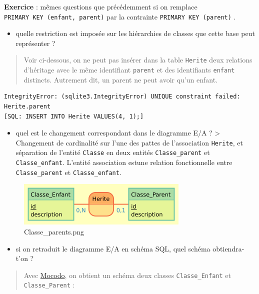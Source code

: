 \documentclass[11pt]{article}
\makeatletter
\def\maxwidth{\ifdim\Gin@nat@width>\linewidth\linewidth
    \else\Gin@nat@width\fi}
\let\Oldincludegraphics\includegraphics
\renewcommand{\includegraphics}[1]{\Oldincludegraphics[width=.8\maxwidth]{#1}}
\providecommand{\tightlist}{%
      \setlength{\itemsep}{0pt}\setlength{\parskip}{0pt}}
\makeatother
\begin{document}
    \textbf{Exercice} : mêmes questions que précédemment si on remplace
\texttt{PRIMARY\ KEY\ (enfant,\ parent)} par la contrainte
\texttt{PRIMARY\ KEY\ (parent)} .

\begin{itemize}
\tightlist
\item
  quelle restriction est imposée sur les hiérarchies de classes que
  cette base peut représenter ?
\end{itemize}

\begin{quote}
Voir ci-dessous, on ne peut pas insérer dans la table \texttt{Herite}
deux relations d'héritage avec le même identifiant \texttt{parent} et
des identifiants \texttt{enfant} distincts. Autrement dit, un parent ne
peut avoir qu'un enfant.
\end{quote}

\begin{verbatim}
IntegrityError: (sqlite3.IntegrityError) UNIQUE constraint failed: Herite.parent
[SQL: INSERT INTO Herite VALUES(4, 1);]
\end{verbatim}

\begin{itemize}
\tightlist
\item
  quel est le changement correspondant dans le diagramme E/A ?
  \textgreater{} Changement de cardinalité sur l'une des pattes de
  l'association \texttt{Herite}, et séparation de l'entité
  \texttt{Classe} en deux entités \texttt{Classe\_parent} et
  \texttt{Classe\_enfant}. L'entité association estune relation
  fonctionnelle entre \texttt{Classe\_parent} et
  \texttt{Classe\_enfant}.
\end{itemize}

\begin{figure}
\centering
\includegraphics{mocodo/Classe_enfants2/Classe_enfants2.png}
\caption{Classe\_parents.png}
\end{figure}

\begin{itemize}
\tightlist
\item
  si on retraduit le diagramme E/A en schéma SQL, quel schéma
  obtiendra-t'on ?
\end{itemize}

\begin{quote}
Avec \href{http://mocodo.wingi.net/}{Mocodo}, on obtient un schéma deux
classes \texttt{Classe\_Enfant} et \texttt{Classe\_Parent} :
\end{quote}
\end{document}
